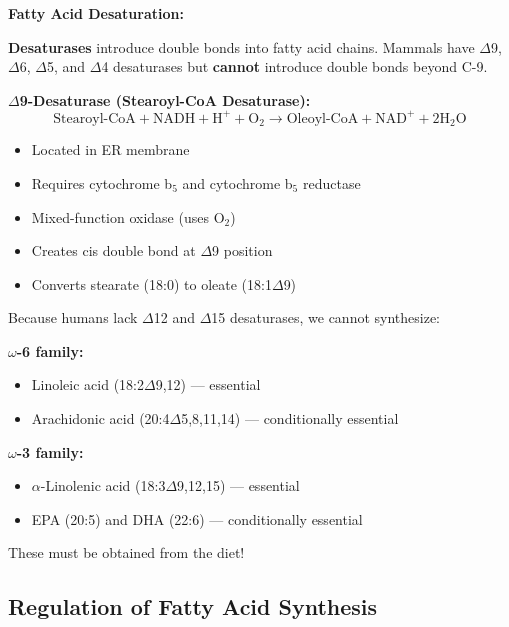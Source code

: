 \textbf{Fatty Acid Desaturation:}

\begin{definition}
\textbf{Desaturases} introduce double bonds into fatty acid chains. Mammals have $\Delta$9, $\Delta$6, $\Delta$5, and $\Delta$4 desaturases but \textbf{cannot} introduce double bonds beyond C-9.
\end{definition}

\textbf{$\Delta$9-Desaturase (Stearoyl-CoA Desaturase):}
\[
\text{Stearoyl-CoA} + \text{NADH} + \text{H}^+ + \text{O}_2 \rightarrow \text{Oleoyl-CoA} + \text{NAD}^+ + 2\text{H}_2\text{O}
\]

\begin{itemize}
    \item Located in ER membrane
    \item Requires cytochrome b$_5$ and cytochrome b$_5$ reductase
    \item Mixed-function oxidase (uses O$_2$)
    \item Creates cis double bond at $\Delta$9 position
    \item Converts stearate (18:0) to oleate (18:1$\Delta$9)
\end{itemize}

\begin{tcolorbox}[colback=red!5, colframe=red!70!black, title=\textbf{Essential Fatty Acids}]
Because humans lack $\Delta$12 and $\Delta$15 desaturases, we cannot synthesize:

\textbf{$\omega$-6 family:}
\begin{itemize}
    \item Linoleic acid (18:2$\Delta$9,12) — essential
    \item Arachidonic acid (20:4$\Delta$5,8,11,14) — conditionally essential
\end{itemize}

\textbf{$\omega$-3 family:}
\begin{itemize}
    \item $\alpha$-Linolenic acid (18:3$\Delta$9,12,15) — essential
    \item EPA (20:5) and DHA (22:6) — conditionally essential
\end{itemize}

These must be obtained from the diet!
\end{tcolorbox}

\subsection{Regulation of Fatty Acid Synthesis}

